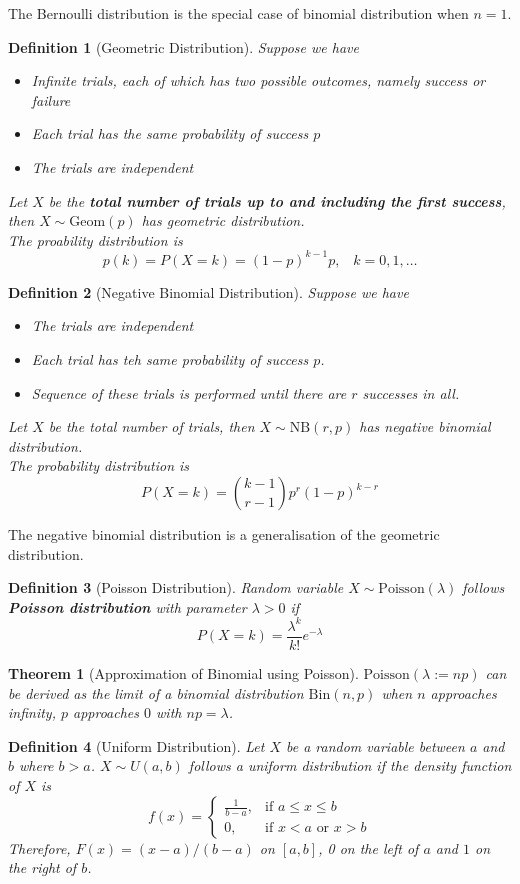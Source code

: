 \documentclass[12pt]{article}
\newcommand{\bin}{\mathrm{Bin}}
\newcommand{\geom}{\mathrm{Geom}}
\newcommand{\Poi}{\mathrm{Poisson}}
\newcommand{\nb}{\mathrm{NB}}
\newtheorem{definition}{Definition}[section]
\newtheorem{theorem}{Theorem}[section]
\theoremstyle{definition}
\begin{document}
The Bernoulli distribution is the special case of binomial distribution when $n=1$.
\begin{definition}[Geometric Distribution]
\normalfont Suppose we have
\begin{itemize}
  \item Infinite trials, each of which has two possible outcomes, namely success or failure
  \item Each trial has the same probability of success $p$
  \item The trials are independent
\end{itemize}
Let $X$ be the \textbf{total number of trials up to and including the first success}, then $X\sim\geom(p)$ has geometric distribution.\\
The proability distribution is
\[
p(k) = P(X=k)=(1-p)^{k-1}p, \;\;\; k=0,1,\ldots
\]
\end{definition}
\begin{definition}[Negative Binomial Distribution]
\normalfont Suppose we have
\begin{itemize}
  \item The trials are independent
  \item Each trial has teh same probability of success $p$.
  \item Sequence of these trials is performed until there are $r$ successes in all.
\end{itemize}
Let $X$ be the total number of trials, then $X\sim \nb(r,p)$ has negative binomial distribution.\\
The probability distribution is
\[
P(X=k) = \binom{k-1}{r-1}p^r(1-p)^{k-r}
\]
\end{definition}
The negative binomial distribution is a generalisation of the geometric distribution.
\begin{definition}[Poisson Distribution]
\normalfont Random variable $X\sim\Poi(\lambda)$ follows \textbf{Poisson distribution} with parameter $\lambda>0$ if
\[
P(X=k) = \frac{\lambda^k}{k!}e^{-\lambda}
\]
\end{definition}
\begin{theorem}[Approximation of Binomial using Poisson]
\normalfont $\Poi(\lambda :=np)$ can be derived as the limit of a binomial distribution $\bin(n,p)$ when $n$ approaches infinity, $p$ approaches $0$ with $np = \lambda$.
\end{theorem}
\begin{definition}[Uniform Distribution]
\normalfont Let $X$ be a random variable between $a$ and $b$ where $b>a$. $X\sim U(a,b)$ follows a uniform distribution if the density function of $X$ is
\[
f(x)=\begin{cases}
\frac{1}{b-a},&\text{if } a\leq x\leq b\\
0,\;\;\;      &\text{if } x<a\text{ or }x>b
\end{cases}
\]
Therefore, $F(x) = (x-a)/(b-a) $ on $[a,b]$, 0 on the left of $a$ and $1$ on the right of $b$.
\end{definition}
\end{document}
